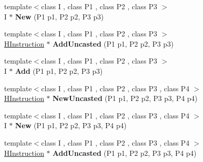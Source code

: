 \begin{DoxyCompactItemize}
\item 
\hypertarget{classv8_1_1internal_1_1_h_graph_builder_ada350fd78c23c1fa3716ddd4ec312d4e}{}{\footnotesize template$<$class I , class P1 , class P2 , class P3 $>$ }\\I $\ast$ {\bfseries New} (P1 p1, P2 p2, P3 p3)\label{classv8_1_1internal_1_1_h_graph_builder_ada350fd78c23c1fa3716ddd4ec312d4e}

\item 
\hypertarget{classv8_1_1internal_1_1_h_graph_builder_aff2d81ad06ed7719007cfc326b884d72}{}{\footnotesize template$<$class I , class P1 , class P2 , class P3 $>$ }\\\hyperlink{classv8_1_1internal_1_1_h_instruction}{H\+Instruction} $\ast$ {\bfseries Add\+Uncasted} (P1 p1, P2 p2, P3 p3)\label{classv8_1_1internal_1_1_h_graph_builder_aff2d81ad06ed7719007cfc326b884d72}

\item 
\hypertarget{classv8_1_1internal_1_1_h_graph_builder_abd15e7596368f13569e6c3b050b7f884}{}{\footnotesize template$<$class I , class P1 , class P2 , class P3 $>$ }\\I $\ast$ {\bfseries Add} (P1 p1, P2 p2, P3 p3)\label{classv8_1_1internal_1_1_h_graph_builder_abd15e7596368f13569e6c3b050b7f884}

\item 
\hypertarget{classv8_1_1internal_1_1_h_graph_builder_a288d97c75872e441ed1084e05b203410}{}{\footnotesize template$<$class I , class P1 , class P2 , class P3 , class P4 $>$ }\\\hyperlink{classv8_1_1internal_1_1_h_instruction}{H\+Instruction} $\ast$ {\bfseries New\+Uncasted} (P1 p1, P2 p2, P3 p3, P4 p4)\label{classv8_1_1internal_1_1_h_graph_builder_a288d97c75872e441ed1084e05b203410}

\item 
\hypertarget{classv8_1_1internal_1_1_h_graph_builder_ad7f2e521d1197f68aa812228b8bac315}{}{\footnotesize template$<$class I , class P1 , class P2 , class P3 , class P4 $>$ }\\I $\ast$ {\bfseries New} (P1 p1, P2 p2, P3 p3, P4 p4)\label{classv8_1_1internal_1_1_h_graph_builder_ad7f2e521d1197f68aa812228b8bac315}

\item 
\hypertarget{classv8_1_1internal_1_1_h_graph_builder_a7e66f56c6ee19aada6a057d977bbe84b}{}{\footnotesize template$<$class I , class P1 , class P2 , class P3 , class P4 $>$ }\\\hyperlink{classv8_1_1internal_1_1_h_instruction}{H\+Instruction} $\ast$ {\bfseries Add\+Uncasted} (P1 p1, P2 p2, P3 p3, P4 p4)\label{classv8_1_1internal_1_1_h_graph_builder_a7e66f56c6ee19aada6a057d977bbe84b}


\end{DoxyCompactItemize}
